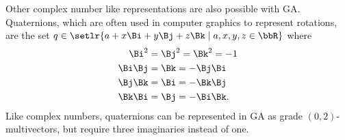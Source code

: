 Other complex number like representations are also possible with GA.
Quaternions, which are often used in computer graphics to represent rotations,
are the set \( q \in \setlr{ a + x \Bi + y \Bj + z \Bk \mid a, x, y, z \in \bbR} \) where
\begin{equation}\label{eqn:complex:1240}
\begin{aligned}
\Bi^2 &= \Bj^2 = \Bk^2 = -1 \\
\Bi \Bj &= \Bk = -\Bj \Bi \\
\Bj \Bk &= \Bi = -\Bk \Bj \\
\Bk \Bi &= \Bj = -\Bi \Bk.
\end{aligned}
\end{equation}
Like complex numbers, quaternions can be represented in GA as grade \((0,2)\)-multivectors, but require three imaginaries instead of one.

